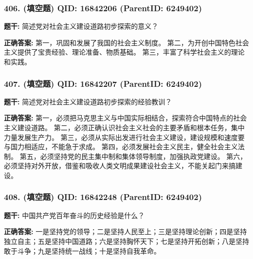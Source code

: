 \documentclass[12pt,UTF8]{ctexart}
\begin{document}
\vspace{0.3em}\hrulefill\vspace{0.7em}

\subsubsection*{406. (填空题) \small QID: 16842206 (ParentID: 6249402)}

\textbf{题干:}
简述党对社会主义建设道路初步探索的意义？



\textbf{正确答案:}
第一，巩固和发展了我国的社会主义制度。
第二，为开创中国特色社会主义提供了宝贵经验、理论准备、物质基础。
第三，丰富了科学社会主义的理论和实践。

\vspace{0.3em}\hrulefill\vspace{0.7em}

\subsubsection*{407. (填空题) \small QID: 16842207 (ParentID: 6249402)}

\textbf{题干:}
简述党对社会主义建设道路初步探索的经验教训？



\textbf{正确答案:}
第一，必须把马克思主义与中国实际相结合，探索符合中国特点的社会主义建设道路。
第二，必须正确认识社会主义社会的主要矛盾和根本任务，集中力量发展生产力。
第三，必须从实际出发进行社会主义建设，建设规模和速度要与国力相适应，不能急于求成。
第四，必须发展社会主义民主，健全社会主义法制。
第五，必须坚持党的民主集中制和集体领导制度，加强执政党建设。
第六，必须坚持对外开放，借鉴和吸收人类文明成果建设社会主义，不能关起门来搞建设。

\vspace{0.3em}\hrulefill\vspace{0.7em}

\subsubsection*{408. (填空题) \small QID: 16842248 (ParentID: 6249402)}

\textbf{题干:}
中国共产党百年奋斗的历史经验是什么？



\textbf{正确答案:}
一是坚持党的领导；二是坚持人民至上；三是坚持理论创新；四是坚持独立自主；五是坚持中国道路；六是坚持胸怀天下；七是坚持开拓创新；八是坚持敢于斗争；九是坚持统一战线；十是坚持自我革命。
\end{document}
